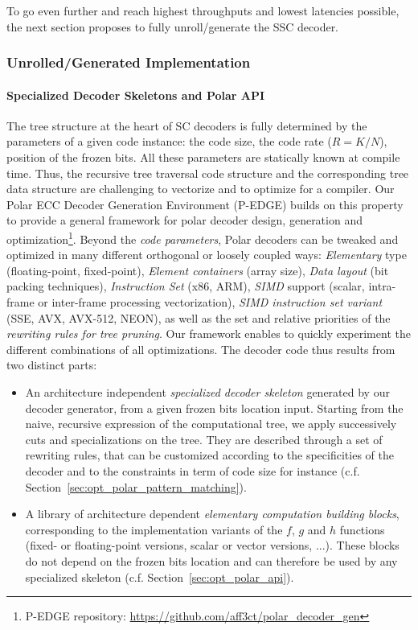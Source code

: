 To go even further and reach highest throughputs and lowest latencies possible,
the next section proposes to fully unroll/generate the SSC decoder.

\subsubsection{Unrolled/Generated Implementation}
\label{sec:opt_polar_pedge}

\paragraph{Specialized Decoder Skeletons and Polar API}

The tree structure at the heart of SC decoders is fully determined by the
parameters of a given code instance: the code size, the code rate ($R = K / N$),
position of the frozen bits. All these parameters are  statically known at
compile time. Thus, the recursive tree traversal code structure and the
corresponding tree data structure are challenging to vectorize and to optimize
for a compiler. Our Polar ECC Decoder Generation Environment (P-EDGE) builds on
this property to provide a general framework for polar decoder design,
generation and optimization\footnote{P-EDGE repository: \url{https://github.com/aff3ct/polar_decoder_gen}}.
Beyond the \emph{code parameters}, Polar decoders
can be tweaked and optimized in many different orthogonal or loosely coupled
ways: \emph{Elementary} type (floating-point, fixed-point),
\emph{Element containers} (array size), \emph{Data layout} (bit packing
techniques), \emph{Instruction Set} (x86, ARM\R), \emph{SIMD} support (scalar,
intra-frame or inter-frame processing vectorization), \emph{SIMD instruction set
variant} (SSE, AVX, AVX-512, NEON), as well as the set and relative priorities
of the \emph{rewriting rules for tree pruning}. Our framework enables to quickly
experiment the different combinations of all optimizations. The decoder code
thus results from two distinct parts:
\begin{itemize}
  \item An architecture independent \emph{specialized decoder skeleton}
    generated by our decoder generator, from a given frozen bits location input.
    Starting from the naive, recursive expression of the computational tree, we
    apply successively cuts and specializations on the tree. They are described
    through a set of rewriting rules, that can be customized according to the
    specificities of the decoder and to the constraints in term of code size for
    instance (c.f. Section~\ref{sec:opt_polar_pattern_matching}).
  \item A library of architecture dependent \emph{elementary computation
    building blocks}, corresponding to the implementation variants of the $f$,
    $g$ and $h$ functions (fixed- or floating-point versions, scalar or vector
    versions, ...). These blocks do not depend on the frozen bits location and
    can therefore be used by any specialized skeleton (c.f.
    Section~\ref{sec:opt_polar_api}).
\end{itemize}

